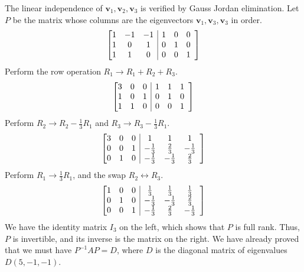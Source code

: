 \documentclass[10pt]{article}
\def\v{\bm{v}}
\begin{document}
        The linear independence of $\v_1, \v_2, \v_3$ is verified by Gauss Jordan elimination.
        Let $P$ be the matrix whose columns are the eigenvectors $\v_1, \v_3, \v_3$ in order.
        \[
                \left[\begin{array}{@{}ccc|ccc}
                        1 & -1 & -1     & 1 & 0 & 0 \\
                        1 &  0 &  1     & 0 & 1 & 0 \\
                        1 &  1 &  0     & 0 & 0 & 1
                \end{array}\right]
        \]
        Perform the row operation $R_1 \rightarrow R_1 + R_2 + R_3$.
        \[
                \left[\begin{array}{@{}ccc|ccc}
                        3 &  0 &  0     & 1 & 1 & 1 \\
                        1 &  0 &  1     & 0 & 1 & 0 \\
                        1 &  1 &  0     & 0 & 0 & 1
                \end{array}\right]
        \]
        Perform $R_2 \rightarrow R_2 - \frac{1}{3}R_1$ and $R_3 \rightarrow R_3 - \frac{1}{3}R_1$.
        \[
                \left[\begin{array}{@{}ccc|ccc}
                        3 &  0 &  0     & 1 & 1 & 1 \\
                        0 &  0 &  1     & -\frac{1}{3} & \frac{2}{3} & -\frac{1}{3} \\
                        0 &  1 &  0     & -\frac{1}{3} & -\frac{1}{3} & \frac{2}{3}
                \end{array}\right]
        \]
        Perform $R_1 \rightarrow \frac{1}{3}R_1$, and the swap $R_2 \leftrightarrow R_3$.
        \[
                \left[\begin{array}{@{}ccc|ccc}
                        1 &  0 &  0     & \frac{1}{3} & \frac{1}{3} & \frac{1}{3} \\
                        0 &  1 &  0     & -\frac{1}{3} & -\frac{1}{3} & \frac{2}{3} \\
                        0 &  0 &  1     & -\frac{1}{3} & \frac{2}{3} & -\frac{1}{3}
                \end{array}\right]
        \]
        We have the identity matrix $I_3$ on the left, which shows that $P$ is full rank. Thus, $P$ is invertible, and its inverse is the
        matrix on the right.
        We have already proved that we must have $P^{-1}AP = D$, where $D$ is the diagonal matrix of eigenvalues $D(5, -1, -1)$.
\end{document}
